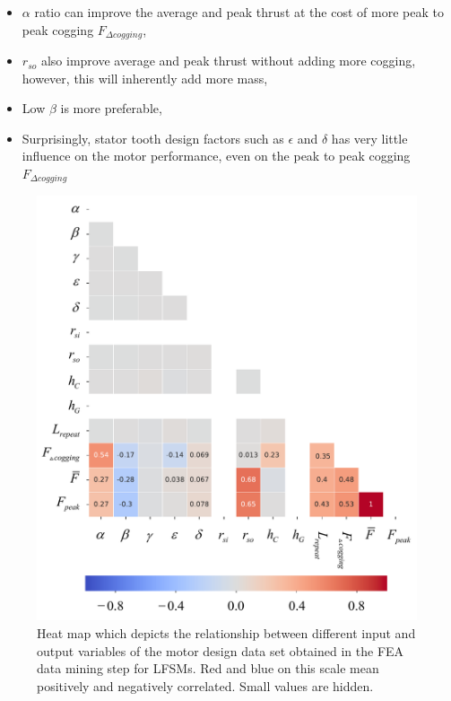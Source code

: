             
            \begin{itemize}
                \item $\alpha$ ratio can improve the average and peak thrust at the cost of more peak to peak cogging $F_{\Delta cogging}$,
                \item $r_{so}$ also improve average and peak thrust without adding more cogging, however, this will inherently add more mass,
                \item Low $\beta$ is more preferable,
                \item Surprisingly, stator tooth design factors such as $\epsilon$ and $\delta$ has very little influence on the motor performance, even on the peak to peak cogging $F_{\Delta cogging}$
            \end{itemize}
            
            
            \begin{figure}
                \centering
                \includegraphics[width=5in, trim=0 0 0 129mm, clip]{chap4/images2/heatmap.pdf}
                \caption{Heat map which depicts the relationship between different input and output variables of the motor design data set obtained in the \acs{FEA} data mining step for \acsp{LFSM}. Red and blue on this scale mean positively and negatively correlated. Small values are hidden.}
                \label{fig:chap/rsm/LFSM/data mining/heat map}
            \end{figure}
        
